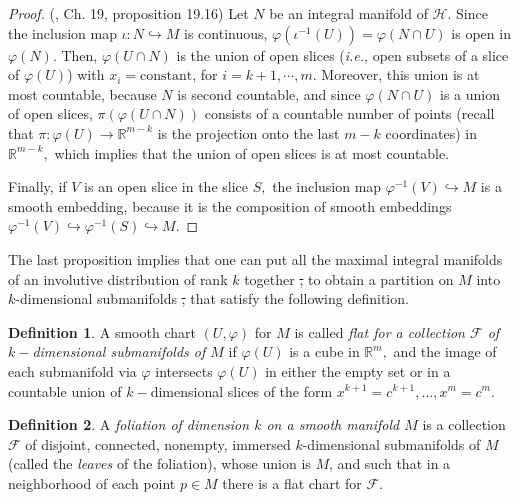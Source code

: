 \documentclass[12pt, letterpaper, reqno]{amsart}
\theoremstyle{definition}
\newtheorem{df}{Definition}
\theoremstyle{plain}
\theoremstyle{remark}
\providecommand{\DIFdel}[1]{{\protect\color{red}\sout{#1}}}                      %
\providecommand{\DIFdelbegin}{} %
\providecommand{\DIFdelend}{} %
\newcommand{\DIFscaledelfig}{0.5}
\newlength{\DIFdelgraphicswidth} %
\newlength{\DIFdelgraphicsheight} %
\newcommand{\DIFdelincludegraphics}[2][]{%
\sbox{\DIFdelgraphicsbox}{\DIFOincludegraphics[#1]{#2}}%
\settoboxwidth{\DIFdelgraphicswidth}{\DIFdelgraphicsbox} %
\settoboxtotalheight{\DIFdelgraphicsheight}{\DIFdelgraphicsbox} %
\scalebox{\DIFscaledelfig}{%
\parbox[b]{\DIFdelgraphicswidth}{\usebox{\DIFdelgraphicsbox}\\[-\baselineskip] \rule{\DIFdelgraphicswidth}{0em}}\llap{\resizebox{\DIFdelgraphicswidth}{\DIFdelgraphicsheight}{%
\setlength{\unitlength}{\DIFdelgraphicswidth}%
\begin{picture}(1,1)%
\thicklines\linethickness{2pt} %
{\color[rgb]{1,0,0}\put(0,0){\framebox(1,1){}}}%
{\color[rgb]{1,0,0}\put(0,0){\line( 1,1){1}}}%
{\color[rgb]{1,0,0}\put(0,1){\line(1,-1){1}}}%
\end{picture}%
}\hspace*{3pt}}} %
} %
\DeclareRobustCommand{\DIFdelbegin}{\DIFOdelbegin \let\includegraphics\DIFdelincludegraphics} %
\DeclareRobustCommand{\DIFdelend}{\DIFOaddend \let\includegraphics\DIFOincludegraphics} %
\begin{document}
\begin{proof}(\cite{lee2003introduction}, Ch. 19, proposition 19.16)
	Let $ N $ be an integral manifold of $ \mathcal{H}. $ Since the inclusion map $ \iota: N \hookrightarrow M $ is continuous, $ \varphi( \iota^{-1}(U))=\varphi(N\cap U) $  is open in $ \varphi(N) $. Then, $ \varphi(U\cap N) $ is the union of open slices (\textit{i.e.}, open subsets of a slice of $ \varphi(U)$) with $ x_i=\text{constant} $, for $ i=k+1,\cdots,m.$ Moreover, this union is at most countable, because $ N $ is second countable, and since $ \varphi(N\cap U) $ is a union of open slices, $ \pi(\varphi(U\cap N)) $ consists of a countable number of points (recall that $ \pi: \varphi(U) \rightarrow \mathbb{R}^{m-k} $ is the projection onto the last $ m-k $ coordinates) in $ \mathbb{R}^{m-k}, $ which implies that the union of open slices is at most countable.  

	Finally, if $ V $ is an open slice in the slice $ S, $ the inclusion map $ \varphi^{-1}(V) \hookrightarrow M $ is a smooth embedding, because it is the composition of smooth embeddings $ \varphi^{-1}(V)\hookrightarrow \varphi^{-1}(S) \hookrightarrow M.$ 
\end{proof}

The last proposition implies that one can put all the maximal integral manifolds of an involutive distribution of rank $ k $  together \DIFdelbegin \DIFdel{, }\DIFdelend to obtain a partition on $ M $ into $ k $-dimensional submanifolds \DIFdelbegin \DIFdel{, }\DIFdelend that satisfy the following definition.
\begin{df}
	A smooth chart $ (U,\varphi) $ for $ M $ is called \textit{flat for a collection $ \mathcal{F} $ of $ k- $dimensional submanifolds of $ M $} if $ \varphi(U) $ is a cube in $ \mathbb{R}^m, $ and the image of each submanifold via $ \varphi $ intersects $ \varphi(U) $ in either the empty set or in a countable union of $ k- $dimensional slices of the form $ x^{k+1}=c^{k+1},\dots,x^m=c^m. $   
\end{df}

\begin{df}
	A \textit{foliation of dimension $ k $ on a smooth manifold $ M $} is a collection $ \mathcal{F} $ of disjoint, connected, nonempty, immersed $ k $-dimensional submanifolds of $ M $ (called the \textit{leaves} of the foliation), whose union is $ M $, and such that in a neighborhood of each point $ p\in M $ there is a flat chart for $ \mathcal{F}. $  
\end{df}
\end{document}
